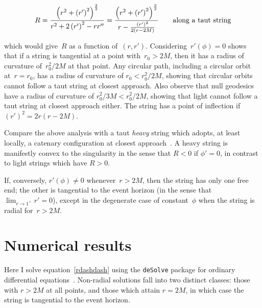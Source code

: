 \begin{equation}\label{roc}
  R = \frac{
    \left(r^2 + \left(r'\right)^2\right)^\frac{3}{2}
  }{
    r^2 + 2\left(r'\right)^2-rr''
  }
  =
  \frac{
    \left(r^2 + \left(r'\right)^2\right)^\frac{3}{2}
  }{
    r-\frac{\left(r'\right)^2}{2\left(r-2M\right)}
  }\qquad\mbox{along a taut string}
\end{equation}

\noindent which would give~$R$ as a function of~$\left(r,r'\right)$.
Considering~$r'(\phi)=0$ shows that if a string is tangential at a
point with~$r_0>2M$, then it has a radius of curvature of~$r_0^2/2M$
at that point.  Any circular path, including a circular orbit
at~$r=r_0$, has a radius of curvature of $r_0<r_0^2/2M$, showing that
circular orbits cannot follow a taut string at closest approach.  Also
observe that null geodesics have a radius of curvature of $r_0^2/3M <
r_0^2/2M$, showing that light cannot follow a taut string at closest
approach either.  The string has a point of inflection
if~$\left(r'\right)^2=2r(r-2M)$.

Compare the above analysis with a taut {\em heavy} string which
adopts, at least locally, a catenary configuration at closest
approach~\cite{nguyen2007}.  A heavy string is manifestly convex to
the singularity in the sense that $R<0$ if $\phi'=0$, in contrast to
light strings which have $R>0$.

If, conversely, $r'(\phi)\neq 0$ whenever~$r>2M$, then the string has
only one free end; the other is tangential to the event horizon (in
the sense that ${\displaystyle \lim_{r\longrightarrow 1^+}r'=0}$),
except in the degenerate case of constant~$\phi$ when the string is
radial for~$r>2M$.

\section{Numerical results}

Here I solve equation~\ref{rdashdash} using the \verb+deSolve+ package
for ordinary differential equations~\cite{soetart2010}.  Non-radial
solutions fall into two distinct classes: those with $r>2M$ at all
points, and those which attain $r=2M$, in which case the string is
tangential to the event horizon.

